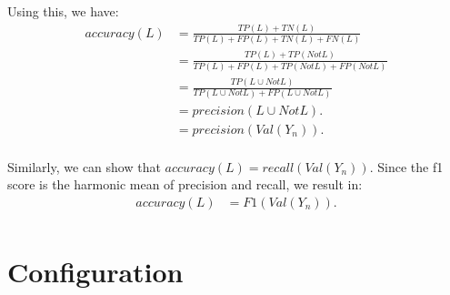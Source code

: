 Using this, we have:
\begin{equation*}
\begin{split}
  \mathit{accuracy}(L)&=\frac{TP(L)+TN(L)}{TP(L)+FP(L)+TN(L)+FN(L)}\\
  &=\frac{TP(L)+TP(\mathit{NotL})}{TP(L)+FP(L)+TP(\mathit{NotL})+FP(\mathit{NotL})}\\
  &=\frac{TP(L\cup\mathit{NotL})}{TP(L\cup\mathit{NotL})+FP(L\cup\mathit{NotL})}\\
  &=\mathit{precision}(L\cup\mathit{NotL}).\\
  &=\mathit{precision}(\textit{Val}(Y_n)).\\
\end{split}
\end{equation*}

Similarly, we can show that $\mathit{accuracy}(L)=\mathit{recall}(\textit{Val}(Y_n))$.
Since the \gls{f1 score} is the harmonic mean of \gls{precision} and \gls{recall}, we result in:
\begin{equation*}
\begin{split}
  \mathit{accuracy}(L)&=\textit{F1}(\textit{Val}(Y_n)).\\
\end{split}
\end{equation*}

\section{Configuration}\label{app:sec-configuration}

